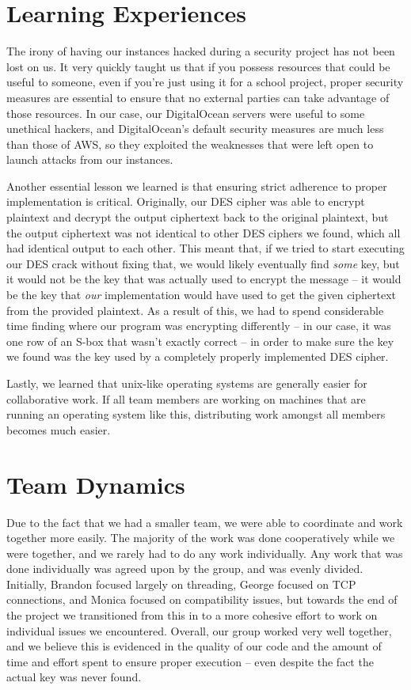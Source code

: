\documentclass{article}
\begin{document}
\section{Learning Experiences}
The irony of having our instances hacked during a security project has not been lost on us. It very quickly taught us that if you possess resources that could be useful to someone, even if you're just using it for a school project, proper security measures are essential to ensure that no external parties can take advantage of those resources. In our case, our DigitalOcean servers were useful to some unethical hackers, and DigitalOcean's default security measures are much less than those of AWS, so they exploited the weaknesses that were left open to launch attacks from our instances.

Another essential lesson we learned is that ensuring strict adherence to proper implementation is critical. Originally, our DES cipher was able to encrypt plaintext and decrypt the output ciphertext back to the original plaintext, but the output ciphertext was not identical to other DES ciphers we found, which all had identical output to each other. This meant that, if we tried to start executing our DES crack without fixing that, we would likely eventually find \textit{some} key, but it would not be the key that was actually used to encrypt the message -- it would be the key that \textit{our} implementation would have used to get the given ciphertext from the provided plaintext. As a result of this, we had to spend considerable time finding where our program was encrypting differently -- in our case, it was one row of an S-box that wasn't exactly correct -- in order to make sure the key we found was the key used by a completely properly implemented DES cipher. 

Lastly, we learned that unix-like operating systems are generally easier for collaborative work. If all team members are working on machines that are running an operating system like this, distributing work amongst all members becomes much easier.
\section{Team Dynamics}
Due to the fact that we had a smaller team, we were able to coordinate and work together more easily. The majority of the work was done cooperatively while we were together, and we rarely had to do any work individually. Any work that was done individually was agreed upon by the group, and was evenly divided. Initially, Brandon focused largely on threading, George focused on TCP connections, and Monica focused on compatibility issues, but towards the end of the project we transitioned from this in to a more cohesive effort to work on individual issues we encountered. Overall, our group worked very well together, and we believe this is evidenced in the quality of our code and the amount of time and effort spent to ensure proper execution -- even despite the fact the actual key was never found.
\end{document}
